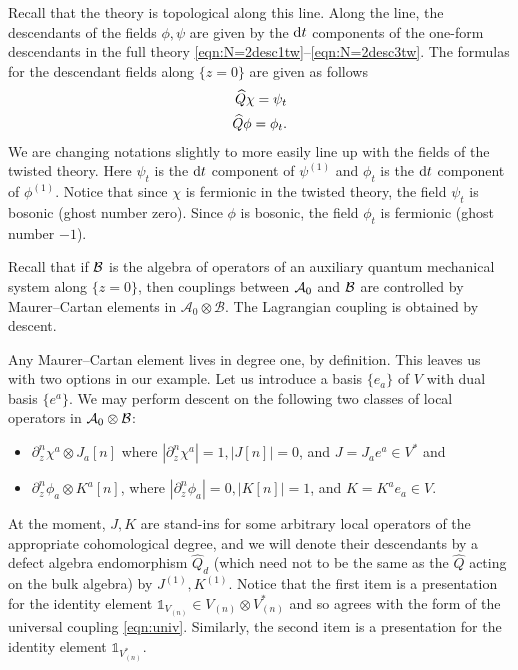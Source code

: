 \documentclass[11pt]{amsart}
\def\id{\mathbb{1}}
\begin{document}
Recall that the theory is topological along this line. 
Along the line, the descendants of the fields $\phi, \psi$ are given by the $\d t$ components of the one-form descendants in the full theory \eqref{eqn:N=2desc1tw}--\eqref{eqn:N=2desc3tw}. 
The formulas for the descendant fields along $\{z=0\}$ are given as follows
\begin{align*}
\Hat{Q} \chi = \psi_t \\
\Hat{Q} \phi = \phi_t . 
\end{align*}
We are changing notations slightly to more easily line up with the fields of the twisted theory. 
Here $\psi_t$ is the $\d t$ component of $\psi^{(1)}$ and $\phi_t$ is the $\d t$ component of $\phi^{(1)}$. 
Notice that since $\chi$ is fermionic in the twisted theory, the field $\psi_t$ is bosonic (ghost number zero). 
Since $\phi$ is bosonic, the field $\phi_t$ is fermionic (ghost number $-1$). 



Recall that if $\cB$ is the algebra of operators of an auxiliary quantum mechanical system along $\{z=0\}$, then couplings between $\cA_0$ and $\cB$ are controlled by Maurer--Cartan elements in $\mathcal{A}_0\otimes \mathcal{B}$.
The Lagrangian coupling is obtained by descent. 

Any Maurer--Cartan element lives in degree one, by definition. This leaves us with two options in our example. 
Let us introduce a basis $\{e_a\}$ of $V$ with dual basis $\{e^a\}$.
We may perform descent on the following two classes of local operators in $\cA_0 \otimes \cB$:
\begin{itemize}
\item $\partial_z^n \chi^a \otimes J_a[n]$ where $|\partial_z^n \chi^a| = 1, |J[n]|=0$, and $J = J_a e^a \in V^*$ and
\item $\partial_z^n \phi_a \otimes K^a[n]$, where $|\partial_z^n \phi_a|=0, |K[n]| = 1$, and $K = K^a e_a \in V$. 
\end{itemize}
At the moment, $J, K$ are stand-ins for some arbitrary local operators of the appropriate cohomological degree, and we will denote their descendants by a defect algebra endomorphism $\hat{Q}_{d}$ (which need not to be the same as the $\hat{Q}$ acting on the bulk algebra) by $J^{(1)}, K^{(1)}$. 
Notice that the first item is a presentation for the identity element $\id_{V_{(n)}} \in V_{(n)} \otimes V_{(n)}^*$ and so agrees with the form of the universal coupling \eqref{eqn:univ}. 
Similarly, the second item is a presentation for the identity element $\id_{V^*_{(n)}}$. 
\end{document}
